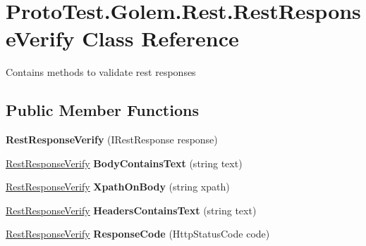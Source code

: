 \hypertarget{class_proto_test_1_1_golem_1_1_rest_1_1_rest_response_verify}{\section{Proto\-Test.\-Golem.\-Rest.\-Rest\-Response\-Verify Class Reference}
\label{class_proto_test_1_1_golem_1_1_rest_1_1_rest_response_verify}
}


Contains methods to validate rest responses  


\subsection*{Public Member Functions}
\begin{DoxyCompactItemize}
\item 
\hypertarget{class_proto_test_1_1_golem_1_1_rest_1_1_rest_response_verify_a54c0f1656fc058732703c90f339b676a}{{\bfseries Rest\-Response\-Verify} (I\-Rest\-Response response)}\label{class_proto_test_1_1_golem_1_1_rest_1_1_rest_response_verify_a54c0f1656fc058732703c90f339b676a}

\item 
\hypertarget{class_proto_test_1_1_golem_1_1_rest_1_1_rest_response_verify_a6bc391d1ffe9e590dd5c16a049e3ca78}{\hyperlink{class_proto_test_1_1_golem_1_1_rest_1_1_rest_response_verify}{Rest\-Response\-Verify} {\bfseries Body\-Contains\-Text} (string text)}\label{class_proto_test_1_1_golem_1_1_rest_1_1_rest_response_verify_a6bc391d1ffe9e590dd5c16a049e3ca78}

\item 
\hypertarget{class_proto_test_1_1_golem_1_1_rest_1_1_rest_response_verify_a0866967069db352d926a76831d509d10}{\hyperlink{class_proto_test_1_1_golem_1_1_rest_1_1_rest_response_verify}{Rest\-Response\-Verify} {\bfseries Xpath\-On\-Body} (string xpath)}\label{class_proto_test_1_1_golem_1_1_rest_1_1_rest_response_verify_a0866967069db352d926a76831d509d10}

\item 
\hypertarget{class_proto_test_1_1_golem_1_1_rest_1_1_rest_response_verify_af2ce99cb53493208e1dd6099e46d525d}{\hyperlink{class_proto_test_1_1_golem_1_1_rest_1_1_rest_response_verify}{Rest\-Response\-Verify} {\bfseries Headers\-Contains\-Text} (string text)}\label{class_proto_test_1_1_golem_1_1_rest_1_1_rest_response_verify_af2ce99cb53493208e1dd6099e46d525d}

\item 
\hypertarget{class_proto_test_1_1_golem_1_1_rest_1_1_rest_response_verify_ad1c789bfb4b7050e9b0c1e22daedd201}{\hyperlink{class_proto_test_1_1_golem_1_1_rest_1_1_rest_response_verify}{Rest\-Response\-Verify} {\bfseries Response\-Code} (Http\-Status\-Code code)}\label{class_proto_test_1_1_golem_1_1_rest_1_1_rest_response_verify_ad1c789bfb4b7050e9b0c1e22daedd201}

\end{DoxyCompactItemize}


